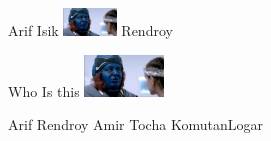 \documentclass{exam}
\begin{document}
\begin{questions}
\begin{oneparchoices}
Arif Isik
\choice \includegraphics[height=2em]{rendroy2.jpg}
Rendroy
\end{oneparchoices}
\question Who Is this\newline
\includegraphics[height=3em]{rendroy2.jpg} \newline
\begin{oneparchoices}
\choice Arif
\choice Rendroy
\choice Amir Tocha
\choice KomutanLogar
\end{oneparchoices}
\end{questions}
\end{document}

